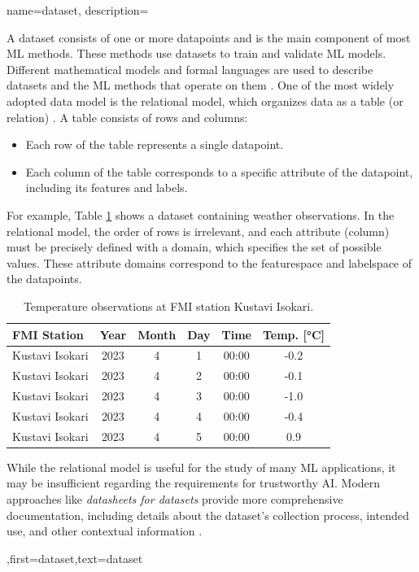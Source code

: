 {name={dataset},
	description={A dataset consists of one or more \gls{datapoint}s and is 
		the main component of most ML methods. These methods use datasets to train and 
		validate ML \gls{model}s. Different mathematical models and formal languages are 
		used to describe datasets and the ML methods that operate on them \cite{silberschatz2019database,abiteboul1995foundations,hoberman2009data,ramakrishnan2002database}. 
		One of the most widely adopted data model is the relational model, 
		which organizes data as a table (or relation) \cite{silberschatz2019database}.
		A table consists of rows and columns:
		\begin{itemize} 
		\item Each row of the table represents a single \gls{datapoint}.
		\item Each column of the table corresponds to a specific attribute of the \gls{datapoint}, including its \gls{feature}s and \gls{label}s.
		\end{itemize}
		For example, Table \ref{tab:temperature_dict} shows a dataset containing weather observations. 
		In the relational model, the order of rows is irrelevant, and each attribute (column) must be 
		precisely defined with a domain, which specifies the set of possible values. These attribute 
		domains correspond to the \gls{featurespace} and \gls{labelspace} of the \gls{datapoint}s.
		\begin{table}[ht]
	\centering
	\begin{tabular}{|l|c|c|c|c|c|}
		\hline
		\textbf{FMI Station} & \textbf{Year} & \textbf{Month} & \textbf{Day} & \textbf{Time} & \textbf{Temp. [°C]} \\ 
		\hline
		Kustavi Isokari & 2023 & 4 & 1 & 00:00 & -0.2 \\ \hline
		Kustavi Isokari & 2023 & 4 & 2 & 00:00 & -0.1 \\ \hline
		Kustavi Isokari & 2023 & 4 & 3 & 00:00 & -1.0 \\ \hline
		Kustavi Isokari & 2023 & 4 & 4 & 00:00 & -0.4 \\ \hline
		Kustavi Isokari & 2023 & 4 & 5 & 00:00 & 0.9 \\ \hline
	\end{tabular}
	\caption{Temperature observations at FMI station Kustavi Isokari.}
	\label{tab:temperature_dict}
\end{table}
 While the relational model is useful for the study of many ML applications, it may be 
 insufficient regarding the requirements for trustworthy AI. Modern 
 approaches like \emph{datasheets for datasets} provide more comprehensive 
 documentation, including details about the dataset’s collection process, intended 
 use, and other contextual information \cite{DatasheetData2021}.},first={dataset},text={dataset}  
}

